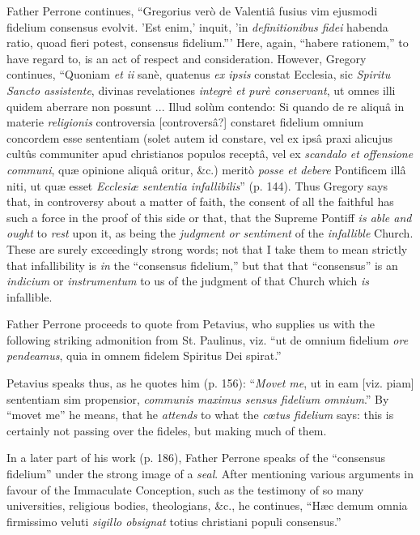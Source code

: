 Father Perrone continues, ``Gregorius verò de
Valentiâ fusius vim ejusmodi fidelium consensus evolvit. 'Est enim,'
inquit, 'in \emph{definitionibus fidei} habenda ratio, quoad fieri
potest, consensus fidelium.''' Here, again, ``habere rationem,'' to have
regard to, is an act of respect and consideration. However, Gregory
continues, ``Quoniam \emph{et ii} sanè, quatenus \emph{ex ipsis} constat
Ecclesia, sic \emph{Spiritu Sancto assistente}, divinas revelationes \emph{integrè
et purè conservant}, ut omnes illi quidem aberrare non possunt ...
Illud solùm contendo: Si quando de re aliquâ in materie \emph{religionis}
controversia [controversâ?] constaret fidelium omnium concordem esse
sententiam (solet autem id constare, vel ex ipsâ praxi alicujus cultûs
communiter apud christianos populos receptâ, vel ex \emph{scandalo et}
\emph{offensione communi}, quæ opinione aliquâ oritur, \&c.)
meritò \emph{posse et debere} Pontificem illâ niti, ut quæ esset \emph{Ecclesiæ
sententia infallibilis}'' (p. 144). Thus Gregory says that, in
controversy about a matter of faith, the consent of all the faithful has
such a force in the proof of this side or that, that the Supreme Pontiff
\emph{is able and ought} to \emph{rest} upon it, as being the \emph{judgment
or sentiment} of the \emph{infallible} Church. These are surely
exceedingly strong words; not that I take them to mean strictly that
infallibility is \emph{in} the ``consensus fidelium,'' but that that ``consensus''
is an \emph{indicium} or \emph{instrumentum} to us of the judgment of
that Church which \emph{is} infallible.

Father Perrone proceeds to quote from Petavius, who
supplies us with the following striking admonition from St. Paulinus,
viz. ``ut de omnium fidelium \emph{ore pendeamus}, quia in omnem fidelem
Spiritus Dei spirat.''

Petavius speaks thus, as he quotes him (p. 156): ``\emph{Movet
me}, ut in eam [viz. piam] sententiam sim propensior, \emph{communis
maximus sensus fidelium omnium}.'' By ``movet me'' he means, that he \emph{attends}
to what the \emph{cœtus fidelium} says: this is certainly not passing
over the fideles, but making much of them.

In a later part of his work (p. 186), Father
Perrone speaks of the ``consensus fidelium'' under the strong image of a \emph{seal}.
After mentioning various arguments in favour of the Immaculate
Conception, such as the testimony of so many universities, religious
bodies, theologians, \&c., he continues, ``Hæc demum omnia firmissimo
veluti \emph{sigillo obsignat} totius christiani populi consensus.''

